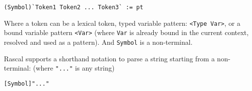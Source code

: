 \begin{lstlisting}
(Symbol)`Token1 Token2 ... Token3` := pt
\end{lstlisting}

Where a token can be a lexical token, typed variable pattern: \lstinline$<Type Var>$, or a bound variable pattern \lstinline$<Var>$ (where \lstinline$Var$ is already bound in the current context, resolved and used as a pattern). And \lstinline$Symbol$ is a non-terminal.

Rascal supports a shorthand notation to parse a string starting from a non-terminal: (where \lstinline$"..."$ is any string)

\begin{lstlisting}
[Symbol]"..."
\end{lstlisting}
